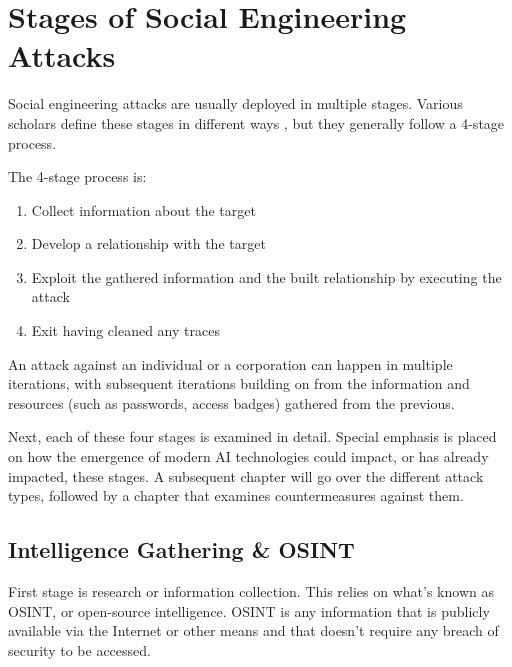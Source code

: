 



\chapter{Stages of Social Engineering Attacks\label{stages}}

Social engineering attacks are usually deployed in multiple stages. Various scholars define these stages in different ways \citep{mouton_social_2016}, but they generally follow a 4-stage process.

The 4-stage process is:

\begin{enumerate}
    \item Collect information about the target
    \item Develop a relationship with the target
    \item Exploit the gathered information and the built relationship by executing the attack
    \item Exit having cleaned any traces
\end{enumerate}

An attack against an individual or a corporation can happen in multiple iterations, with subsequent iterations building on from the information and resources (such as passwords, access badges) gathered from the previous.

Next, each of these four stages is examined in detail. Special emphasis is placed on how the emergence of modern AI technologies could impact, or has already impacted, these stages. A subsequent chapter will go over the different attack types, followed by a chapter that examines countermeasures against them.






\section{Intelligence Gathering \& OSINT}

First stage is research or information collection. This relies on what's known as OSINT, or open-source intelligence. OSINT is any information that is publicly available via the Internet or other means and that doesn't require any breach of security to be accessed.

